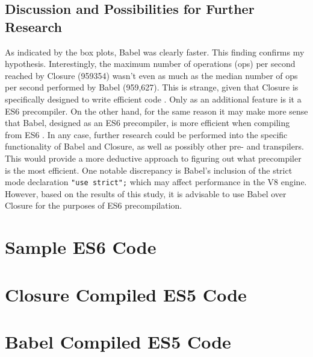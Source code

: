 \documentclass[12pt]{article}
\begin{document}
\subsection{Discussion and Possibilities for Further Research}
As indicated by the box plots, Babel was clearly faster. This finding confirms my hypothesis. Interestingly, the maximum number of operations (ops) per second reached by Closure (959354) wasn't even as much as the median number of ops per second performed by Babel (959,627). This is strange, given that Closure is specifically designed to write efficient code \cite{closure}. Only as an additional feature is it a ES6 precompiler. On the other hand, for the same reason it may make more sense that Babel, designed as an ES6 precompiler, is more efficient when compiling from ES6 \cite{babel}. In any case, further research could be performed into the specific functionality of Babel and Closure, as well as possibly other pre- and transpilers. This would provide a more deductive approach to figuring out what precompiler is the most efficient. One notable discrepancy is Babel's inclusion of the strict mode declaration \texttt{"use strict";} which may affect performance in the V8 engine. However, based on the results of this study, it is advisable to use Babel over Closure for the purposes of ES6 precompilation.


\clearpage
\printbibliography[
heading=bibintoc,
title={Works Cited}
]
\clearpage
\begin{appendices}
\section{Sample ES6 Code}

\clearpage
\section{Closure Compiled ES5 Code}

\clearpage
\section{Babel Compiled ES5 Code}

\end{appendices}
\end{document}
